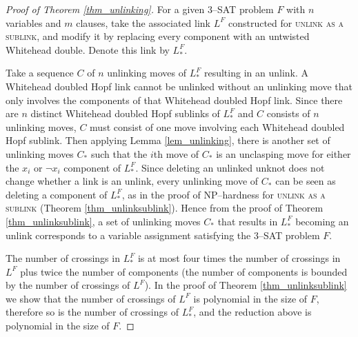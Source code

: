 \documentclass[12pt]{amsart}
\theoremstyle{definition}
\theoremstyle{remark}
\begin{document}
\begin{proof}[Proof of Theorem \ref{thm_unlinking}]
For a given 3--\textsc{SAT} problem $F$ with $n$ variables and $m$ clauses, take the associated link $L^F$ constructed for \textsc{unlink as a sublink}, and modify it by replacing every component with an untwisted Whitehead double.
Denote this link by $L_{*}^F$.

Take a sequence $C$ of $n$ unlinking moves of $L_{*}^F$ resulting in an unlink.
A Whitehead doubled Hopf link cannot be unlinked without an unlinking move that only involves the components of that Whitehead doubled Hopf link.
Since there are $n$ distinct Whitehead doubled Hopf sublinks of $L_{*}^F$ and $C$ consists of $n$ unlinking moves, $C$ must consist of one move involving each Whitehead doubled Hopf sublink.
Then applying Lemma \ref{lem_unlinking}, there is another set of unlinking moves $C_*$ such that the $i$th move of $C_*$ is an unclasping move for either the $x_i$ or $\neg x_i$ component of $L_*^F$.
Since deleting an unlinked unknot does not change whether a link is an unlink, every unlinking move of $C_*$ can be seen as deleting a component of $L_*^F$, as in the proof of NP--hardness for \textsc{unlink as a sublink} (Theorem \ref{thm_unlinksublink}).
Hence from the proof of Theorem \ref{thm_unlinksublink}, a set of unlinking moves $C_*$ that results in $L_*^F$ becoming an unlink corresponds to a variable assignment satisfying the 3--\textsc{SAT} problem $F$.

The number of crossings in $L_*^F$ is at most four times the number of crossings in $L^F$ plus twice the number of components (the number of components is bounded by the number of crossings of $L^F$).
In the proof of Theorem \ref{thm_unlinksublink} we show that the number of crossings of $L^F$ is polynomial in the size of $F$, therefore so is the number of crossings of $L^F_*$, and the reduction above is polynomial in the size of $F$.
\end{proof}
\end{document}

